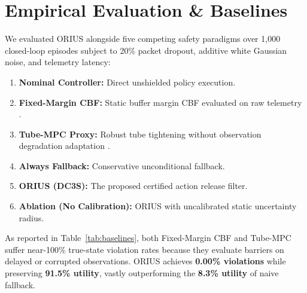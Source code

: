 \documentclass[conference]{IEEEtran}
\begin{document}
\section{Empirical Evaluation \& Baselines}
We evaluated ORIUS alongside five competing safety paradigms over 1,000 closed-loop episodes subject to 20\% packet dropout, additive white Gaussian noise, and telemetry latency:
\begin{enumerate}
    \item \textbf{Nominal Controller:} Direct unshielded policy execution.
    \item \textbf{Fixed-Margin CBF:} Static buffer margin CBF evaluated on raw telemetry \cite{ames_cbf_2019}.
    \item \textbf{Tube-MPC Proxy:} Robust tube tightening without observation degradation adaptation \cite{annurev_safety_filter_2024}.
    \item \textbf{Always Fallback:} Conservative unconditional fallback.
    \item \textbf{ORIUS (DC3S):} The proposed certified action release filter.
    \item \textbf{Ablation (No Calibration):} ORIUS with uncalibrated static uncertainty radius.
\end{enumerate}

\begin{table}[ht]
\caption{Baseline Performance Comparison under Observation Degradation}
\label{tab:baselines}
\centering
{}
\end{table}

As reported in Table~\ref{tab:baselines}, both Fixed-Margin CBF and Tube-MPC suffer near-100\% true-state violation rates because they evaluate barriers on delayed or corrupted observations. ORIUS achieves \textbf{0.00\% violations} while preserving \textbf{91.5\% utility}, vastly outperforming the \textbf{8.3\% utility} of naive fallback.
\end{document}
